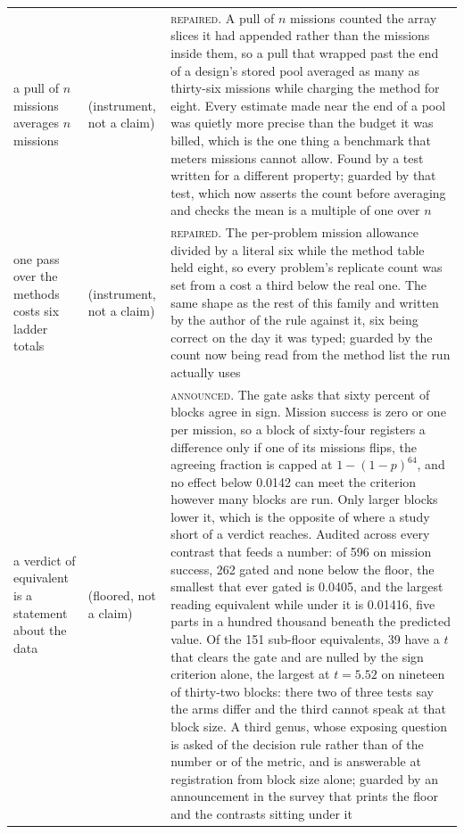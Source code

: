 \begin{tabular}{@{}p{}p{}p{}@{}}
a pull of $n$ missions averages $n$ missions & (instrument, not a claim) & \textsc{repaired}. A pull of $n$ missions counted the array slices it had appended rather than the missions inside them, so a pull that wrapped past the end of a design's stored pool averaged as many as thirty-six missions while charging the method for eight. Every estimate made near the end of a pool was quietly more precise than the budget it was billed, which is the one thing a benchmark that meters missions cannot allow. Found by a test written for a different property; guarded by that test, which now asserts the count before averaging and checks the mean is a multiple of one over $n$ \\
one pass over the methods costs six ladder totals & (instrument, not a claim) & \textsc{repaired}. The per-problem mission allowance divided by a literal six while the method table held eight, so every problem's replicate count was set from a cost a third below the real one. The same shape as the rest of this family and written by the author of the rule against it, six being correct on the day it was typed; guarded by the count now being read from the method list the run actually uses \\
a verdict of equivalent is a statement about the data & (floored, not a claim) & \textsc{announced}. The gate asks that sixty percent of blocks agree in sign. Mission success is zero or one per mission, so a block of sixty-four registers a difference only if one of its missions flips, the agreeing fraction is capped at $1-(1-p)^{64}$, and no effect below 0.0142 can meet the criterion however many blocks are run. Only larger blocks lower it, which is the opposite of where a study short of a verdict reaches. Audited across every contrast that feeds a number: of 596 on mission success, 262 gated and none below the floor, the smallest that ever gated is 0.0405, and the largest reading equivalent while under it is 0.01416, five parts in a hundred thousand beneath the predicted value. Of the 151 sub-floor equivalents, 39 have a $t$ that clears the gate and are nulled by the sign criterion alone, the largest at $t = 5.52$ on nineteen of thirty-two blocks: there two of three tests say the arms differ and the third cannot speak at that block size. A third genus, whose exposing question is asked of the decision rule rather than of the number or of the metric, and is answerable at registration from block size alone; guarded by an announcement in the survey that prints the floor and the contrasts sitting under it \\

\end{tabular}
